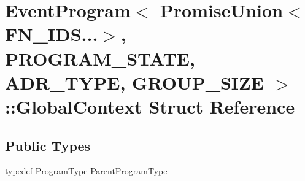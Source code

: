 \hypertarget{structEventProgram_3_01PromiseUnion_3_01FN__IDS_8_8_8_4_00	PROGRAM__STATE_00	ADR__TYPE_00	GROUP__SIZE_01_4_1_1GlobalContext}{\section{Event\-Program$<$ Promise\-Union$<$ F\-N\-\_\-\-I\-D\-S...$>$, P\-R\-O\-G\-R\-A\-M\-\_\-\-S\-T\-A\-T\-E, A\-D\-R\-\_\-\-T\-Y\-P\-E, G\-R\-O\-U\-P\-\_\-\-S\-I\-Z\-E $>$\-:\-:Global\-Context Struct Reference}
\label{structEventProgram_3_01PromiseUnion_3_01FN__IDS_8_8_8_4_00	PROGRAM__STATE_00	ADR__TYPE_00	GROUP__SIZE_01_4_1_1GlobalContext}
}
\subsection*{Public Types}
\begin{DoxyCompactItemize}
\item 
typedef \hyperlink{structEventProgram_3_01PromiseUnion_3_01FN__IDS_8_8_8_4_00	PROGRAM__STATE_00	ADR__TYPE_00	GROUP__SIZE_01_4_ade24e2f14ee74ca43ebfa5edfa7571df}{Program\-Type} \hyperlink{structEventProgram_3_01PromiseUnion_3_01FN__IDS_8_8_8_4_00	PROGRAM__STATE_00	ADR__TYPE_00	GROUP__SIZE_01_4_1_1GlobalContext_a3c560fa22d5ae8c174de3f5fb3c6bb36}{Parent\-Program\-Type}
\end{DoxyCompactItemize}
